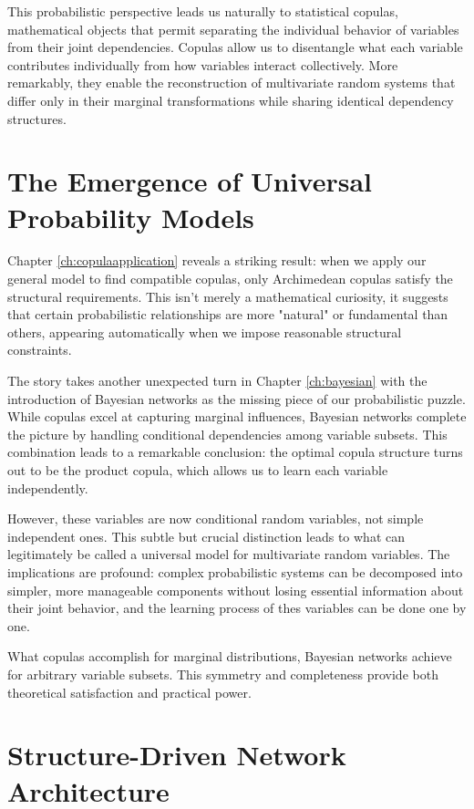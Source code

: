 \documentclass[
	11pt, %
	fleqn, %
	a4paper, %
]{LegrandOrangeBook}
\begin{document}
This probabilistic perspective leads us naturally to statistical copulas, mathematical objects that permit separating the individual behavior of variables from their joint dependencies. Copulas allow us to disentangle what each variable contributes individually from how variables interact collectively. More remarkably, they enable the reconstruction of multivariate random systems that differ only in their marginal transformations while sharing identical dependency structures.

\section{The Emergence of Universal Probability Models}

Chapter \ref{ch:copulaapplication} reveals a striking result: when we apply our general model to find compatible copulas, only Archimedean copulas satisfy the structural requirements. This isn't merely a mathematical curiosity, it suggests that certain probabilistic relationships are more "natural" or fundamental than others, appearing automatically when we impose reasonable structural constraints.

The story takes another unexpected turn in Chapter \ref{ch:bayesian} with the introduction of Bayesian networks as the missing piece of our probabilistic puzzle. While copulas excel at capturing marginal influences, Bayesian networks complete the picture by handling conditional dependencies among variable subsets. This combination leads to a remarkable conclusion: the optimal copula structure turns out to be the product copula, which allows us to learn each variable independently.

However, these variables are now conditional random variables, not simple independent ones. This subtle but crucial distinction leads to what can legitimately be called a universal model for multivariate random variables. The implications are profound: complex probabilistic systems can be decomposed into simpler, more manageable components without losing essential information about their joint behavior, and the learning process of thes variables can be done one by one.

What copulas accomplish for marginal distributions, Bayesian networks achieve for arbitrary variable subsets. This symmetry and completeness provide both theoretical satisfaction and practical power.

\section{Structure-Driven Network Architecture}
\end{document}
